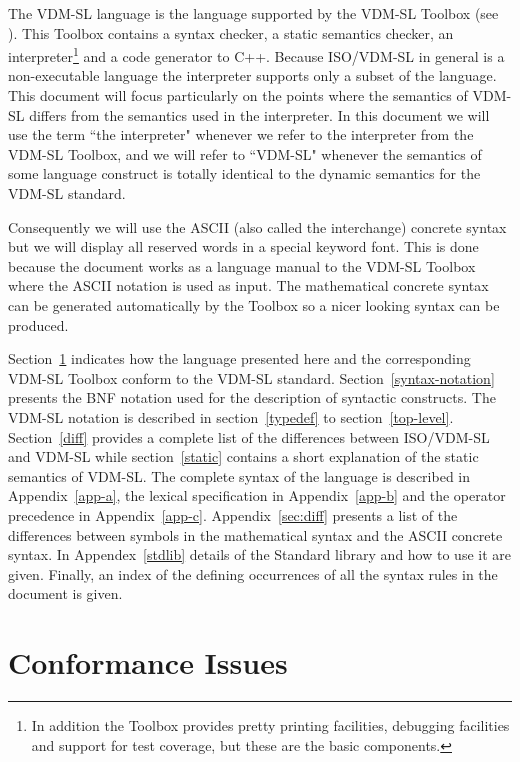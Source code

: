 \documentclass[\pformat,12pt]{article}
\begin{document}
The  VDM-SL language is the language supported by the  VDM-SL
Toolbox (see \cite{UserMan-SCSK}). This Toolbox contains a syntax checker,
a static semantics checker, an interpreter\footnote{In addition the
Toolbox provides pretty printing facilities, debugging facilities and
support for test coverage, but these are the basic components.} and a
code generator to C++. Because ISO/VDM-SL in general is a
non-executable language the interpreter supports only a subset of the
language. This document will focus particularly on the points where
the semantics of VDM-SL differs from the semantics used in the
interpreter. In this document we will use the term ``the interpreter"
whenever we refer to the interpreter from the  VDM-SL Toolbox, and
we will refer to ``VDM-SL" whenever the semantics of some language
construct is totally identical to the dynamic semantics for the VDM-SL
standard.

Consequently we will use the ASCII (also called the interchange)
concrete syntax but we will display all reserved words in a special
keyword font. This is done because the document works as a language
manual to the  VDM-SL Toolbox where the ASCII notation is used as
input. The mathematical concrete syntax can be generated automatically
by the Toolbox so a nicer looking syntax can be produced.

Section~\ref{conformance} indicates how the language presented here and the
corresponding  VDM-SL Toolbox conform to the VDM-SL standard.
Section~\ref{syntax-notation} presents the BNF notation used
for the description of syntactic constructs.  The  VDM-SL
notation is described in section~\ref{typedef} to
section~\ref{top-level}.
Section~\ref{diff} provides a complete list of the differences between
ISO/VDM-SL and  VDM-SL while section~\ref{static} contains a
short explanation of the static semantics of VDM-SL.
The complete syntax of the language is described in Appendix~\ref{app-a}, the
lexical specification in Appendix~\ref{app-b} and the operator precedence
in Appendix~\ref{app-c}. Appendix~\ref{sec:diff} presents a list of the
differences between symbols in the mathematical syntax and the ASCII
concrete syntax. In Appendex~\ref{stdlib} details of the Standard
library and how to use it are given. Finally, an index of the defining
occurrences of 
all the syntax rules in the document is given. 

\section{Conformance Issues}
\label{conformance}
\end{document}
